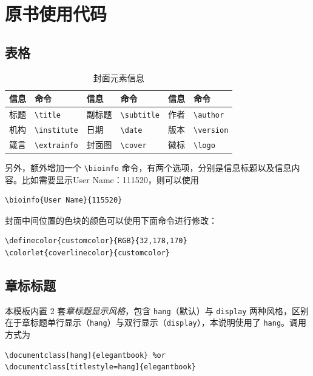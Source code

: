 \documentclass[lang=cn,10pt]{elegantbook}
\begin{document}
\chapter{原书使用代码}
\section{表格}

\begin{table}[htbp]
  \centering
  \caption{封面元素信息}
  \begin{tabular}{p{}p{}|p{}p{}|p{}p{}}
    \toprule
    信息 & 命令 & 信息 & 命令 & 信息 & 命令 \\
    \midrule
    标题 & \lstinline|\title| & 副标题 & \lstinline|\subtitle| & 作者 & \lstinline|\author| \\
    机构 & \lstinline|\institute| & 日期 &  \lstinline|\date| & 版本 & \lstinline|\version| \\
    箴言 & \lstinline|\extrainfo| & 封面图 & \lstinline|\cover| & 徽标 & \lstinline|\logo| \\
    \bottomrule
  \end{tabular}
\end{table}

另外，额外增加一个 \lstinline{\bioinfo} 命令，有两个选项，分别是信息标题以及信息内容。比如需要显示{\kaishu User Name：111520}，则可以使用 
\begin{lstlisting}
\bioinfo{User Name}{115520}
\end{lstlisting}

封面中间位置的色块的颜色可以使用下面命令进行修改：
\begin{lstlisting}
\definecolor{customcolor}{RGB}{32,178,170}
\colorlet{coverlinecolor}{customcolor}
\end{lstlisting}



\section{章标标题}

本模板内置 2 套\textit{章标题显示风格}，包含 \lstinline{hang}（默认）与 \lstinline{display} 两种风格，区别在于章标题单行显示（\lstinline{hang}）与双行显示（\lstinline{display}），本说明使用了 \lstinline{hang}。调用方式为
\begin{lstlisting}
\documentclass[hang]{elegantbook} %or
\documentclass[titlestyle=hang]{elegantbook}
\end{lstlisting}
\end{document}
